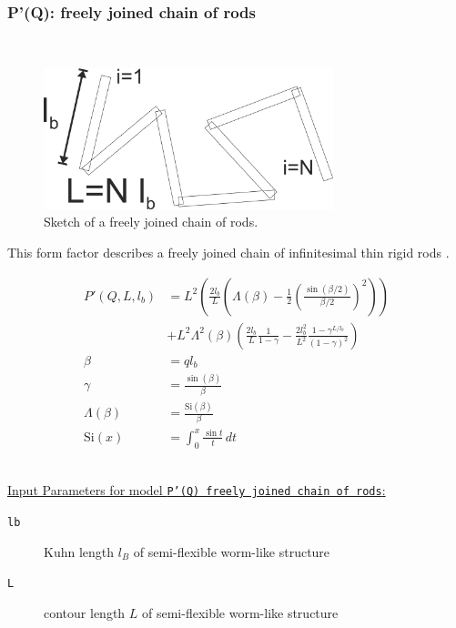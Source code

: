 \clearpage
\subsubsection{P'(Q): freely joined chain of rods} ~\\
\label{plugin:Pprime4freelyjoinedchainofrods}

\begin{figure}[htb]
\begin{center}
\includegraphics[width=0.75\textwidth]{freelyjoinedchainofrod.png}
\end{center}
\caption{Sketch of a freely joined chain of rods.}
\label{fig:freelyjoined chainofrod}
\end{figure}

This form factor describes a freely joined chain of infinitesimal thin rigid rods \cite{Hermans1958}.

\begin{align}
P'(Q,L,l_b) &= L^2\left( \frac{2l_b}{L}\left(\Lambda(\beta)-\frac12\left(\frac{\sin(\beta/2)}{\beta/2}\right)^2\right)\right)
\label{eq:PprimeFreelyJoinedRods}\\
&+L^2\Lambda^2(\beta)\left(\frac{2l_b}{L}\frac{1}{1-\gamma}-\frac{2l_b^2}{L^2}\frac{1-\gamma^{L/l_b}}{\left(1-\gamma\right)^2}\right) \nonumber \\
\beta &= q l_b \\
\gamma &= \frac{\sin(\beta)}{\beta} \\
\Lambda(\beta) &= \frac{\mathrm{Si}(\beta)}{\beta} \\
\mathrm{Si}(x) &= \int _{0}^{x}{\frac {\sin t}{t}}\,dt
\end{align}

\vspace{5mm}

\hspace{1pt}\\
\uline{Input Parameters for model \texttt{P'(Q) freely joined chain of rods}:}\\
\begin{description}
\item[\texttt{lb}] Kuhn length $l_B$ of semi-flexible worm-like structure
\item[\texttt{L}] contour length $L$ of semi-flexible worm-like structure
\end{description}

